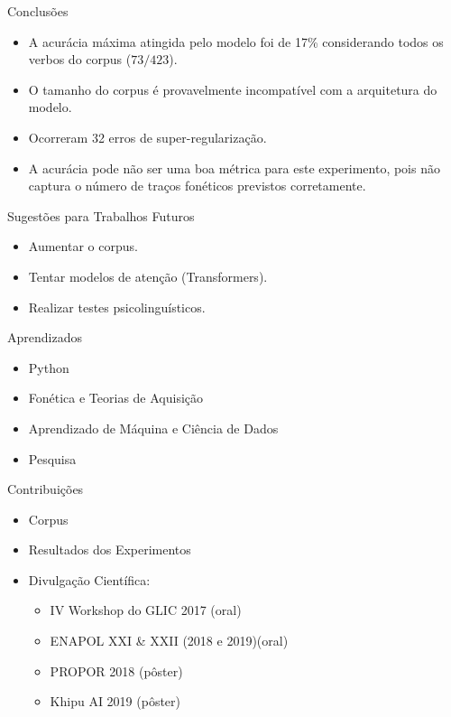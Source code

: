 \begin{frame}{Conclusões}

\begin{itemize}
    \item<1->A acurácia máxima atingida pelo modelo foi de 17\% considerando todos os verbos do corpus ($73/423$). 
    \item<2->O tamanho do corpus é provavelmente incompatível com a arquitetura do modelo.
    \item<3->Ocorreram 32 erros de super-regularização.
    \item<4->A acurácia pode não ser uma boa métrica para este experimento, pois não captura o número de traços fonéticos previstos corretamente.
\end{itemize}


\end{frame}

\begin{frame}{Sugestões para Trabalhos Futuros}

\begin{itemize}
    \item<1-> Aumentar o corpus. 
    \item<2-> Tentar modelos de atenção (Transformers).
    \item<3-> Realizar testes psicolinguísticos.
\end{itemize}

\end{frame}

\begin{frame}{Aprendizados}

\begin{itemize}
    \item<1->Python
    \item<2->Fonética e Teorias de Aquisição
    \item<3->Aprendizado de Máquina e Ciência de Dados
    \item<4->Pesquisa

\end{itemize}

\end{frame}

\begin{frame}{Contribuições}

\begin{itemize}
    \item<1->Corpus 
    \item<2->Resultados dos Experimentos
    \item<3->Divulgação Científica:
    \begin{itemize}
        \item<4->IV Workshop do GLIC 2017 (oral)
        \item<5->ENAPOL XXI \& XXII (2018 e 2019)(oral)
        \item<6->PROPOR 2018 (pôster)
        \item<7->Khipu AI 2019 (pôster)
    \end{itemize}
\end{itemize}

\end{frame}
